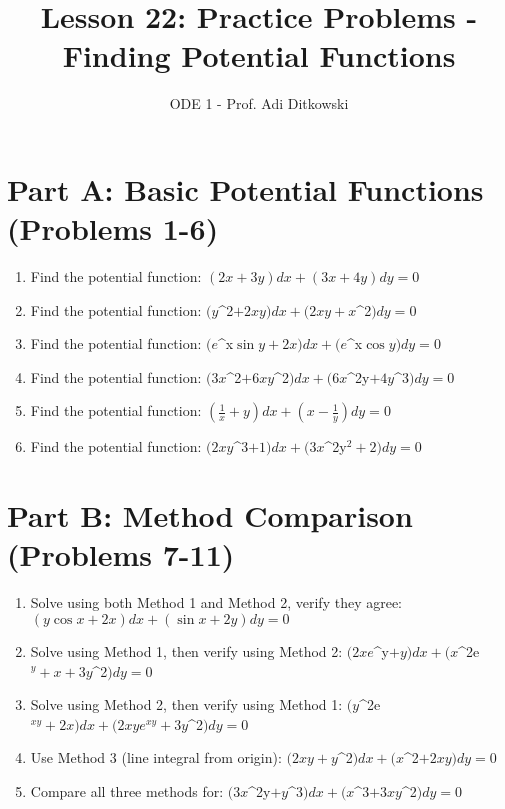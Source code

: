 \documentclass[12pt]{article}
\title{Lesson 22: Practice Problems - Finding Potential Functions}
\author{ODE 1 - Prof. Adi Ditkowski}
\date{}
\begin{document}
\maketitle

\section*{Part A: Basic Potential Functions (Problems 1-6)}

\begin{enumerate}
\item Find the potential function: $(2x + 3y)dx + (3x + 4y)dy = 0$

\item Find the potential function: $(y$^{2}$ + 2xy)dx + (2xy + x$^{2}$)dy = 0$

\item Find the potential function: $(e$^{x}$\sin y + 2x)dx + (e$^{x}$\cos y)dy = 0$

\item Find the potential function: $(3x$^{2}$ + 6xy$^{2}$)dx + (6x$^{2y}$ + 4y$^{3}$)dy = 0$

\item Find the potential function: $\left(\frac{1}{x} + y\right)dx + \left(x - \frac{1}{y}\right)dy = 0$

\item Find the potential function: $(2xy$^{3}$ + 1)dx + (3x$^{2y}$^2 + 2)dy = 0$
\end{enumerate}

\section*{Part B: Method Comparison (Problems 7-11)}

\begin{enumerate}[start=7]
\item Solve using both Method 1 and Method 2, verify they agree:
$(y\cos x + 2x)dx + (\sin x + 2y)dy = 0$

\item Solve using Method 1, then verify using Method 2:
$(2xe$^{y}$ + y)dx + (x$^{2e}$^y + x + 3y$^{2}$)dy = 0$

\item Solve using Method 2, then verify using Method 1:
$(y$^{2e}$^{xy} + 2x)dx + (2xye^{xy} + 3y$^{2}$)dy = 0$

\item Use Method 3 (line integral from origin):
$(2xy + y$^{2}$)dx + (x$^{2}$ + 2xy)dy = 0$

\item Compare all three methods for:
$(3x$^{2y}$ + y$^{3}$)dx + (x$^{3}$ + 3xy$^{2}$)dy = 0$
\end{enumerate}
\end{document}
